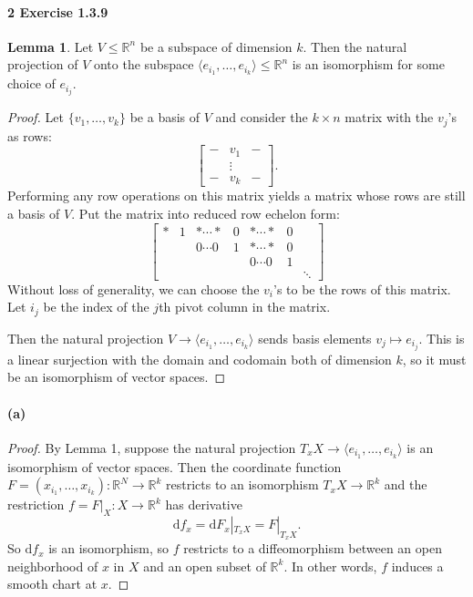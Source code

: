 \documentclass[12pt]{article}
\newlength{\myparskip}
\newenvironment{fullbox}{\begin{lrbox}{\savefullbox}\begin{minipage}{\dimexpr\textwidth-2\fboxsep\relax}\setlength{\parskip}{\myparskip}}{\end{minipage}\end{lrbox}\framebox[\textwidth]{\usebox{\savefullbox}}}
\newenvironment{pbox}[1][]{\begin{fullbox}\def\temp{#1}\ifx\temp\empty\else\paragraph{#1}\phantom{}\fi}{\end{fullbox}}
\theoremstyle{definition}
\newtheorem{lemma}{Lemma}
\newcommand{\R}{\mathbb{R}}
\newcommand{\<}{\langle}
\renewcommand{\>}{\rangle}
\newcommand{\dd}{\mathrm{d}}
\begin{document}
\begin{pbox}[2 Exercise 1.3.9]
\end{pbox}

\begin{lemma}
    Let $V \leq \R^n$ be a subspace of dimension $k$.
    Then the natural projection of $V$ onto the subspace $\<e_{i_1}, \dots, e_{i_k}\> \leq \R^n$ is an isomorphism for some choice of $e_{i_j}$.
\end{lemma}

\begin{proof}
    Let $\{v_1, \dots, v_k\}$ be a basis of $V$ and consider the $k \times n$ matrix with the $v_j$'s as rows:
    \[
        \begin{bmatrix}
            - & v_1 & - \\
            & \vdots & \\
            - & v_k & -
        \end{bmatrix}.
    \]
    Performing any row operations on this matrix yields a matrix whose rows are still a basis of $V$.
    Put the matrix into reduced row echelon form:
    \[
        \begin{bmatrix}
            * & 1 & * \cdots * & 0 & * \cdots * & 0 \\
            && 0 \cdots 0 & 1 & * \cdots * & 0  \\
            &&&& 0 \cdots 0 & 1 \\
            &&&&&& \ddots
        \end{bmatrix}
    \]
    Without loss of generality, we can choose the $v_i$'s to be the rows of this matrix.
    Let $i_j$ be the index of the $j$th pivot column in the matrix.

    Then the natural projection $V \to \<e_{i_1}, \dots, e_{i_k}\>$ sends basis elements $v_j \mapsto e_{i_j}$.
    This is a linear surjection with the domain and codomain both of dimension $k$, so it must be an isomorphism of vector spaces.
\end{proof}

\begin{pbox}[(a)]
\end{pbox}

\begin{proof}
    By Lemma 1, suppose the natural projection $T_xX \to \<e_{i_1}, \dots, e_{i_k}\>$ is an isomorphism of vector spaces.
    Then the coordinate function $F = (x_{i_1}, \dots, x_{i_k}) : \R^N \to \R^k$ restricts to an isomorphism $T_xX \to \R^k$ and the restriction $f = F|_X : X \to \R^k$ has derivative
    \[
        \dd{f}_x = \dd{F}_x|_{T_xX} = F|_{T_xX}.
    \]
    So $\dd{f}_x$ is an isomorphism, so $f$ restricts to a diffeomorphism between an open neighborhood of $x$ in $X$ and an open subset of $\R^k$.
    In other words, $f$ induces a smooth chart at $x$.
\end{proof}
\end{document}
